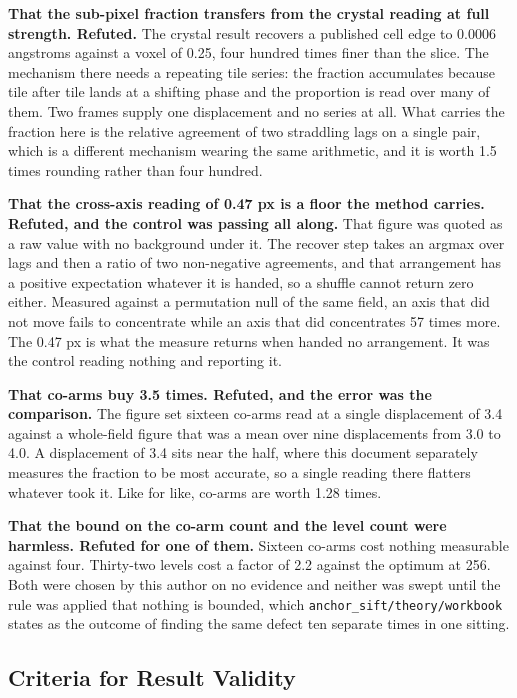 \textbf{That the sub-pixel fraction transfers from the crystal reading at full strength. Refuted.}
The crystal result recovers a published cell edge to 0.0006 angstroms against a voxel of 0.25, four
hundred times finer than the slice. The mechanism there needs a repeating tile series: the fraction
accumulates because tile after tile lands at a shifting phase and the proportion is read over many
of them. Two frames supply one displacement and no series at all. What carries the fraction here is
the relative agreement of two straddling lags on a single pair, which is a different mechanism
wearing the same arithmetic, and it is worth 1.5 times rounding rather than four hundred.

\textbf{That the cross-axis reading of 0.47 px is a floor the method carries. Refuted, and the
control was passing all along.} That figure was quoted as a raw value with no background under it.
The recover step takes an argmax over lags and then a ratio of two non-negative agreements, and that
arrangement has a positive expectation whatever it is handed, so a shuffle cannot return zero
either. Measured against a permutation null of the same field, an axis that did not move fails to
concentrate while an axis that did concentrates 57 times more. The 0.47 px is what the measure
returns when handed no arrangement. It was the control reading nothing and reporting it.

\textbf{That co-arms buy 3.5 times. Refuted, and the error was the comparison.} The figure set
sixteen co-arms read at a single displacement of 3.4 against a whole-field figure that was a mean
over nine displacements from 3.0 to 4.0. A displacement of 3.4 sits near the half, where this
document separately measures the fraction to be most accurate, so a single reading there flatters
whatever took it. Like for like, co-arms are worth 1.28 times.

\textbf{That the bound on the co-arm count and the level count were harmless. Refuted for one of
them.} Sixteen co-arms cost nothing measurable against four. Thirty-two levels cost a factor of 2.2
against the optimum at 256. Both were chosen by this author on no evidence and neither was swept
until the rule was applied that nothing is bounded, which
\texttt{anchor\_sift/\allowbreak{}theory/\allowbreak{}workbook} states as the outcome of finding the
same defect ten separate times in one sitting.

\subsection{Criteria for Result Validity}

